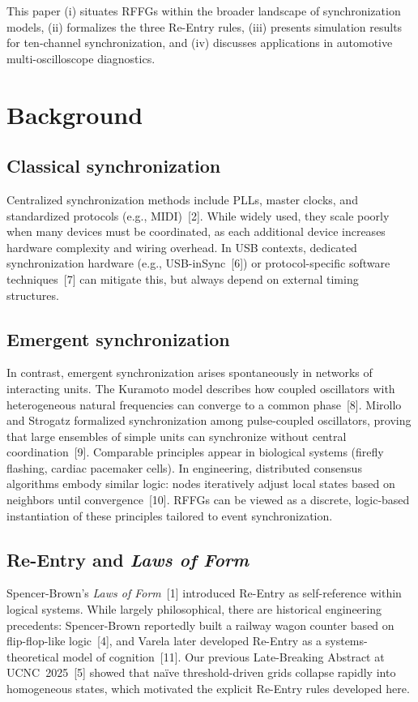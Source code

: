 \documentclass[11pt]{article}
\begin{document}
This paper (i) situates RFFGs within the broader landscape of synchronization models, (ii) formalizes the three Re-Entry rules, (iii) presents simulation results for ten-channel synchronization, and (iv) discusses applications in automotive multi-oscilloscope diagnostics.

\section{Background}

\subsection{Classical synchronization}
Centralized synchronization methods include PLLs, master clocks, and standardized protocols (e.g., MIDI)~[2]. While widely used, they scale poorly when many devices must be coordinated, as each additional device increases hardware complexity and wiring overhead. In USB contexts, dedicated synchronization hardware (e.g., USB-inSync~[6]) or protocol-specific software techniques~[7] can mitigate this, but always depend on external timing structures.

\subsection{Emergent synchronization}
In contrast, emergent synchronization arises spontaneously in networks of interacting units. The Kuramoto model describes how coupled oscillators with heterogeneous natural frequencies can converge to a common phase~[8]. Mirollo and Strogatz formalized synchronization among pulse-coupled oscillators, proving that large ensembles of simple units can synchronize without central coordination~[9]. Comparable principles appear in biological systems (firefly flashing, cardiac pacemaker cells). In engineering, distributed consensus algorithms embody similar logic: nodes iteratively adjust local states based on neighbors until convergence~[10]. RFFGs can be viewed as a discrete, logic-based instantiation of these principles tailored to event synchronization.

\subsection{Re-Entry and \textit{Laws of Form}}
Spencer-Brown’s \textit{Laws of Form}~[1] introduced Re-Entry as self-reference within logical systems. While largely philosophical, there are historical engineering precedents: Spencer-Brown reportedly built a railway wagon counter based on flip-flop-like logic~[4], and Varela later developed Re-Entry as a systems-theoretical model of cognition~[11]. Our previous Late-Breaking Abstract at UCNC~2025~[5] showed that naïve threshold-driven grids collapse rapidly into homogeneous states, which motivated the explicit Re-Entry rules developed here.
\end{document}
